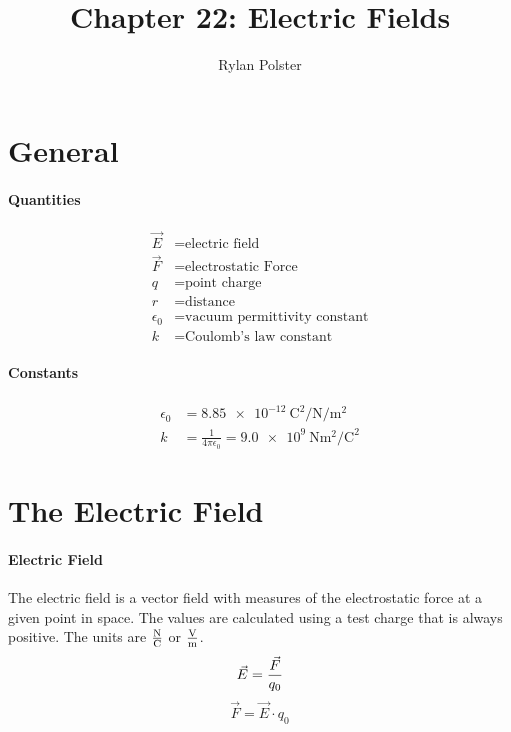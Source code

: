 \documentclass{article}
\title{Chapter 22: Electric Fields}
\author{Rylan Polster}
\begin{document}
    \maketitle
    
    \section*{General}

        \paragraph{Quantities}
        \begin{align}
            \vec{E} &= \text{electric field} \nonumber\\
            \vec{F} &= \text{electrostatic Force} \nonumber\\
            q &= \text{point charge} \nonumber\\
            r &= \text{distance} \nonumber\\
            \epsilon_0 &= \text{vacuum permittivity constant} \nonumber\\
            k &= \text{Coulomb's law constant} \nonumber
        \end{align}

        \paragraph{Constants}
        \begin{align}
            \epsilon_0 &= \SI[per-mode=fraction]{8.85e-12}{\coulomb\squared\per\newton\per\meter\squared} \nonumber\\
            k &= \frac{1}{4 \pi \epsilon_0} = \SI[per-mode=fraction]{9.0e9}{\newton\meter\squared\per\square\coulomb} \nonumber
        \end{align}

    \section{The Electric Field}

        \paragraph{Electric Field}
        The electric field is a vector field with measures of the electrostatic force at a given point in space. The values are calculated using a test charge that is always positive. The units are $\si[per-mode=fraction]{\newton\per\coulomb}$ or $\si[per-mode=fraction]{\volt\per\meter}$.
        \begin{equation}
            \vec{E} = \frac{\vec{F}}{q_0}\\
        \end{equation}
        \begin{equation}
            \vec{F} = \vec{E} \cdot q_0
        \end{equation}
\end{document}
